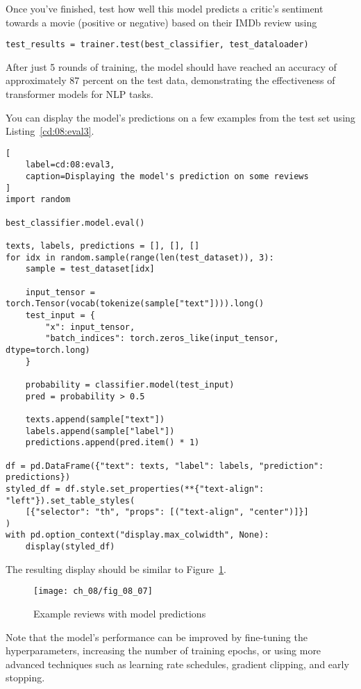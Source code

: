Once you've finished, test how well this model predicts a critic's sentiment towards a movie (positive or negative) based on their IMDb review using
\begin{lstlisting}
test_results = trainer.test(best_classifier, test_dataloader)
\end{lstlisting}
After just 5 rounds of training, the model should have reached an accuracy of approximately 87 percent on the test data, demonstrating the effectiveness of transformer models for NLP tasks.

You can display the model's predictions on a few examples from the test set using Listing~\ref{cd:08:eval3}.
\begin{lstlisting}[
    label=cd:08:eval3,
    caption=Displaying the model's prediction on some reviews
]
import random

best_classifier.model.eval()

texts, labels, predictions = [], [], []
for idx in random.sample(range(len(test_dataset)), 3):
    sample = test_dataset[idx]
    
    input_tensor = torch.Tensor(vocab(tokenize(sample["text"]))).long()
    test_input = {
        "x": input_tensor,
        "batch_indices": torch.zeros_like(input_tensor, dtype=torch.long)
    }

    probability = classifier.model(test_input)
    pred = probability > 0.5
    
    texts.append(sample["text"])
    labels.append(sample["label"])
    predictions.append(pred.item() * 1)

df = pd.DataFrame({"text": texts, "label": labels, "prediction": predictions})
styled_df = df.style.set_properties(**{"text-align": "left"}).set_table_styles(
    [{"selector": "th", "props": [("text-align", "center")]}]
)
with pd.option_context("display.max_colwidth", None):
    display(styled_df)
\end{lstlisting}
The resulting display should be similar to Figure~\ref{fig:08:reviews2}.

\begin{figure}[H]
    \texttt{[image: ch\_08/fig\_08\_07]} %
    \caption{Example reviews with model predictions}
    \label{fig:08:reviews2}
\end{figure}

Note that the model's performance can be improved by fine-tuning the hyperparameters, increasing the number of training epochs, or using more advanced techniques such as learning rate schedules, gradient clipping, and early stopping.

